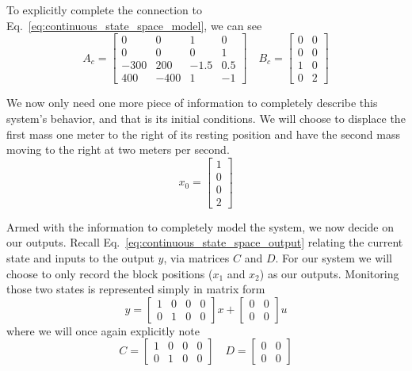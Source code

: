 To explicitly complete the connection to Eq.~\ref{eq:continuous_state_space_model}, we can see
\begin{equation} 
    A_c =
    \begin{bmatrix}
        0 & 0 & 1 & 0 \\
        0 & 0 & 0 & 1 \\
        -300 & 200 & -1.5 & 0.5 \\
        400 & -400 & 1 & -1
    \end{bmatrix}
    \quad
    B_c = 
    \begin{bmatrix}
        0 & 0 \\
        0 & 0 \\
        1 & 0 \\
        0 & 2
    \end{bmatrix}
    \label{eq:Ac_Bc_real}
\end{equation}

We now only need one more piece of information to completely describe this system's behavior, and that is its initial conditions. We will choose to displace the first mass one meter to the right of its resting position and have the second mass moving to the right at two meters per second.
\begin{equation}
    x_0 =
    \begin{bmatrix}
        1 \\ 0 \\ 0 \\ 2
    \end{bmatrix}
    \label{eq:initial_conditions_real}
\end{equation}

Armed with the information to completely model the system, we now decide on our outputs. Recall Eq.~\ref{eq:continuous_state_space_output} relating the current state and inputs to the output $y$, via matrices $C$ and $D$. For our system we will choose to only record the block positions ($x_1$ and $x_2$) as our outputs. Monitoring those two states 
is represented simply in matrix form
\begin{equation}
    y = 
    \begin{bmatrix}
        1 & 0 & 0 & 0 \\
        0 & 1 & 0 & 0
    \end{bmatrix}
    x +
    \begin{bmatrix}
        0 & 0 \\
        0 & 0
    \end{bmatrix}
    u
    \label{eq:continuous_output}
\end{equation}
where we will once again explicitly note
\begin{equation}
    C = 
    \begin{bmatrix}
        1 & 0 & 0 & 0 \\
        0 & 1 & 0 & 0
    \end{bmatrix}
    \quad D =
    \begin{bmatrix}
        0 & 0 \\
        0 & 0
    \end{bmatrix}
    \label{eq:C_D_real}
\end{equation}

